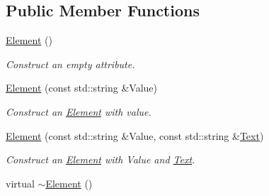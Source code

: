 \subsection*{Public Member Functions}
\begin{DoxyCompactItemize}
\item 
\hypertarget{classphys_1_1xml_1_1Element_a131a975fdcbbdfa021ef54de84184d69}{
\hyperlink{classphys_1_1xml_1_1Element_a131a975fdcbbdfa021ef54de84184d69}{Element} ()}
\label{db/dbd/classphys_1_1xml_1_1Element_a131a975fdcbbdfa021ef54de84184d69}

\begin{DoxyCompactList}\small\item\em Construct an empty attribute. \item\end{DoxyCompactList}\item 
\hyperlink{classphys_1_1xml_1_1Element_a35366ea28e72c3c92dee18b9f70db1b0}{Element} (const std::string \&Value)
\begin{DoxyCompactList}\small\item\em Construct an \hyperlink{classphys_1_1xml_1_1Element}{Element} with value. \item\end{DoxyCompactList}\item 
\hyperlink{classphys_1_1xml_1_1Element_af3d4ffd1b8ea4c8c54c61b737e7e206b}{Element} (const std::string \&Value, const std::string \&\hyperlink{classphys_1_1xml_1_1Text}{Text})
\begin{DoxyCompactList}\small\item\em Construct an \hyperlink{classphys_1_1xml_1_1Element}{Element} with Value and \hyperlink{classphys_1_1xml_1_1Text}{Text}. \item\end{DoxyCompactList}\item 
\hypertarget{classphys_1_1xml_1_1Element_a28f17abe6c1fc88495800aebabbc9854}{
virtual \hyperlink{classphys_1_1xml_1_1Element_a28f17abe6c1fc88495800aebabbc9854}{$\sim$Element} ()}
\label{db/dbd/classphys_1_1xml_1_1Element_a28f17abe6c1fc88495800aebabbc9854}


\end{DoxyCompactItemize}
